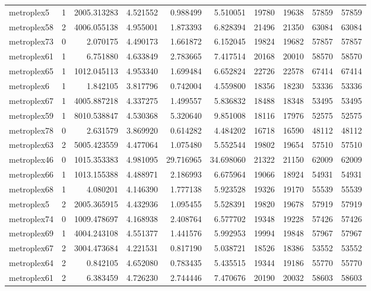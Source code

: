 \begin{longtable}{|l|r|r|r|r|r|r|r|r|r|}
metroplex5 & 1 & 2005.313283 & 4.521552 & 0.988499 & 5.510051 & 19780 & 19638 & 57859 & 57859 \\
metroplex58 & 2 & 4006.055138 & 4.955001 & 1.873393 & 6.828394 & 21496 & 21350 & 63084 & 63084 \\
metroplex73 & 0 & 2.070175 & 4.490173 & 1.661872 & 6.152045 & 19824 & 19682 & 57857 & 57857 \\
metroplex61 & 1 & 6.751880 & 4.633849 & 2.783665 & 7.417514 & 20168 & 20010 & 58570 & 58570 \\
metroplex65 & 1 & 1012.045113 & 4.953340 & 1.699484 & 6.652824 & 22726 & 22578 & 67414 & 67414 \\
metroplex6 & 1 & 1.842105 & 3.817796 & 0.742004 & 4.559800 & 18356 & 18230 & 53336 & 53336 \\
metroplex67 & 1 & 4005.887218 & 4.337275 & 1.499557 & 5.836832 & 18488 & 18348 & 53495 & 53495 \\
metroplex59 & 1 & 8010.538847 & 4.530368 & 5.320640 & 9.851008 & 18116 & 17976 & 52575 & 52575 \\
metroplex78 & 0 & 2.631579 & 3.869920 & 0.614282 & 4.484202 & 16718 & 16590 & 48112 & 48112 \\
metroplex63 & 2 & 5005.423559 & 4.477064 & 1.075480 & 5.552544 & 19802 & 19654 & 57510 & 57510 \\
metroplex46 & 0 & 1015.353383 & 4.981095 & 29.716965 & 34.698060 & 21322 & 21150 & 62009 & 62009 \\
metroplex66 & 1 & 1013.155388 & 4.488971 & 2.186993 & 6.675964 & 19066 & 18924 & 54931 & 54931 \\
metroplex68 & 1 & 4.080201 & 4.146390 & 1.777138 & 5.923528 & 19326 & 19170 & 55539 & 55539 \\
metroplex5 & 2 & 2005.365915 & 4.432936 & 1.095455 & 5.528391 & 19820 & 19678 & 57919 & 57919 \\
metroplex74 & 0 & 1009.478697 & 4.168938 & 2.408764 & 6.577702 & 19348 & 19228 & 57426 & 57426 \\
metroplex69 & 1 & 4004.243108 & 4.551377 & 1.441576 & 5.992953 & 19994 & 19848 & 57967 & 57967 \\
metroplex67 & 2 & 3004.473684 & 4.221531 & 0.817190 & 5.038721 & 18526 & 18386 & 53552 & 53552 \\
metroplex64 & 2 & 0.842105 & 4.652080 & 0.783435 & 5.435515 & 19344 & 19186 & 55770 & 55770 \\
metroplex61 & 2 & 6.383459 & 4.726230 & 2.744446 & 7.470676 & 20190 & 20032 & 58603 & 58603 \\

\end{longtable}
